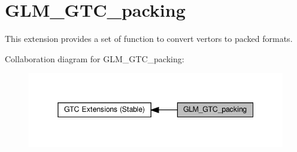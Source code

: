 \hypertarget{group__gtc__packing}{}\section{G\+L\+M\+\_\+\+G\+T\+C\+\_\+packing}
\label{group__gtc__packing}


This extension provides a set of function to convert vertors to packed formats.  


Collaboration diagram for G\+L\+M\+\_\+\+G\+T\+C\+\_\+packing\+:\nopagebreak
\begin{figure}[H]
\begin{center}
\leavevmode
\includegraphics[width=345pt]{group__gtc__packing}
\end{center}
\end{figure}
